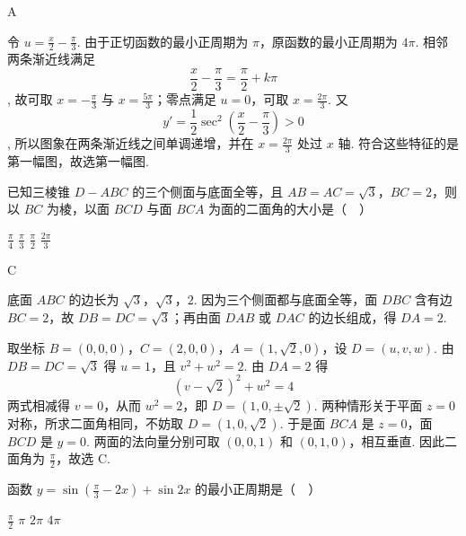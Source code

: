 \begin{answer}
A
\end{answer}

\begin{solution}
令 \(u=\frac x2-\frac\pi3\). 由于正切函数的最小正周期为 \(\pi\)，原函数的最小正周期为 \(4\pi\). 相邻两条渐近线满足
\[
\frac x2-\frac\pi3=\frac\pi2+k\pi
\],
故可取 \(x=-\frac\pi3\) 与 \(x=\frac{5\pi}{3}\)；零点满足 \(u=0\)，可取 \(x=\frac{2\pi}{3}\). 又
\[
y'=\frac12\sec^{2}\left(\frac x2-\frac\pi3\right)>0
\],
所以图象在两条渐近线之间单调递增，并在 \(x=\frac{2\pi}{3}\) 处过 \(x\) 轴. 符合这些特征的是第一幅图，故选第一幅图.
\end{solution}

\begin{problem}
已知三棱锥 \(D - ABC\) 的三个侧面与底面全等，且 \(AB = AC = \sqrt{3}\)，\(BC = 2\)，则以 \(BC\) 为棱，以面 \(BCD\) 与面 \(BCA\) 为面的二面角的大小是（\(\quad\)）

\choices
    {\(\frac{\pi}{4}\)}
    {\(\frac{\pi}{3}\)}
    {\(\frac{\pi}{2}\)}
    {\(\frac{2\pi}{3}\)}

\end{problem}

\begin{answer}
C
\end{answer}

\begin{solution}
底面 \(ABC\) 的边长为 \(\sqrt3\)，\(\sqrt3\)，\(2\). 因为三个侧面都与底面全等，面 \(DBC\) 含有边 \(BC=2\)，故 \(DB=DC=\sqrt3\)；再由面 \(DAB\) 或 \(DAC\) 的边长组成，得 \(DA=2\).

取坐标 \(B=(0,0,0)\)，\(C=(2,0,0)\)，\(A=(1,\sqrt2,0)\)，设 \(D=(u,v,w)\). 由 \(DB=DC=\sqrt3\) 得 \(u=1\)，且 \(v^2+w^2=2\). 由 \(DA=2\) 得
\[
(v-\sqrt2)^2+w^2=4
\]
两式相减得 \(v=0\)，从而 \(w^2=2\)，即 \(D=(1,0,\pm\sqrt2)\). 两种情形关于平面 \(z=0\) 对称，所求二面角相同，不妨取 \(D=(1,0,\sqrt2)\). 于是面 \(BCA\) 是 \(z=0\)，面 \(BCD\) 是 \(y=0\). 两面的法向量分别可取 \((0,0,1)\) 和 \((0,1,0)\)，相互垂直. 因此二面角为 \(\frac\pi2\)，故选 C.
\end{solution}

\begin{problem}
函数 \(y = \sin \left(\frac{\pi}{3} - 2x\right) + \sin 2x\) 的最小正周期是（\(\quad\)）

\choices
    {\(\frac{\pi}{2}\)}
    {\(\pi\)}
    {\(2\pi\)}
    {\(4\pi\)}

\end{problem}

